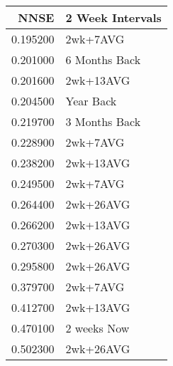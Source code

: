 \begin{tabular}{rl}
NNSE & 2 Week Intervals \\
\hline
0.195200 & 2wk+7AVG \\
0.201000 & 6 Months Back \\
0.201600 & 2wk+13AVG \\
0.204500 & Year Back \\
0.219700 & 3 Months Back \\
0.228900 & 2wk+7AVG \\
0.238200 & 2wk+13AVG \\
0.249500 & 2wk+7AVG \\
0.264400 & 2wk+26AVG \\
0.266200 & 2wk+13AVG \\
0.270300 & 2wk+26AVG \\
0.295800 & 2wk+26AVG \\
0.379700 & 2wk+7AVG \\
0.412700 & 2wk+13AVG \\
0.470100 & 2 weeks Now \\
0.502300 & 2wk+26AVG \\
\hline
\end{tabular}